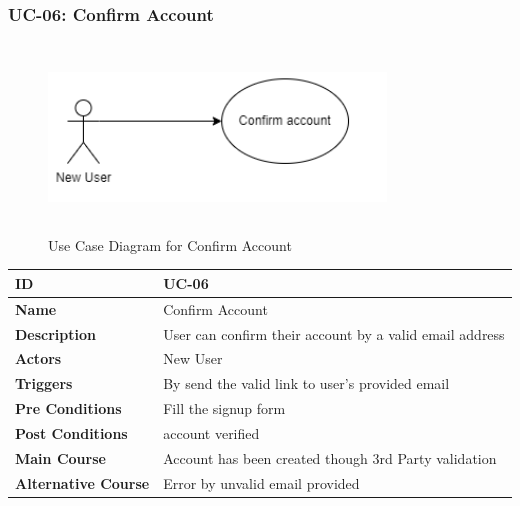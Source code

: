 \subsubsection{UC-06: Confirm Account}
\begin{figure}[H]
    \includegraphics[height=5cm, width=0.8\textwidth]{./diagrams/Use Case/u6.png}
    \centering
    \caption{Use Case Diagram for Confirm Account}
    \label{fig:Usecase1}
\end{figure}

\begin{center}
    \begin{tabularx}{\textwidth}{|l|X|}
        \hline
        \textbf{ID}                 & UC-06                                                   \\
        \hline
        \textbf{Name}               & Confirm Account                                         \\
        \hline
        \textbf{Description}        & User can confirm their account by a valid email address \\
        \hline
        \textbf{Actors}             & New User                                                \\
        \hline
        \textbf{Triggers}           & By send the valid link to user's provided email         \\
        \hline
        \textbf{Pre Conditions}     & Fill the signup form                                    \\
        \hline
        \textbf{Post Conditions}    & account verified                                        \\
        \hline
        \textbf{Main Course}        & Account has been created though 3rd Party validation    \\
        \hline
        \textbf{Alternative Course} & Error by unvalid email provided                         \\
        \hline
    \end{tabularx}
\end{center}
\newpage


